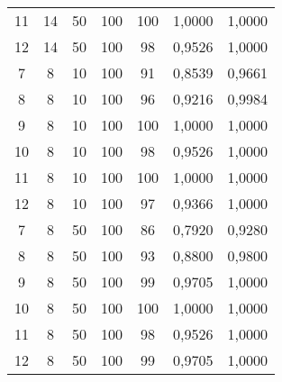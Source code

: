 \begin{table}[H]
\begin{tabular}{@{}ccccccc@{}}
11 & 14                                                    & 50                                                        & 100 & 100 & 1,0000        & 1,0000       \\
12 & 14                                                    & 50                                                        & 100 & 98  & 0,9526        & 1,0000       \\
7  & 8                                                     & 10                                                        & 100 & 91  & 0,8539        & 0,9661       \\
8  & 8                                                     & 10                                                        & 100 & 96  & 0,9216        & 0,9984       \\
9  & 8                                                     & 10                                                        & 100 & 100 & 1,0000        & 1,0000       \\
10 & 8                                                     & 10                                                        & 100 & 98  & 0,9526        & 1,0000       \\
11 & 8                                                     & 10                                                        & 100 & 100 & 1,0000        & 1,0000       \\
12 & 8                                                     & 10                                                        & 100 & 97  & 0,9366        & 1,0000       \\
7  & 8                                                     & 50                                                        & 100 & 86  & 0,7920        & 0,9280       \\
8  & 8                                                     & 50                                                        & 100 & 93  & 0,8800        & 0,9800       \\
9  & 8                                                     & 50                                                        & 100 & 99  & 0,9705        & 1,0000       \\
10 & 8                                                     & 50                                                        & 100 & 100 & 1,0000        & 1,0000       \\
11 & 8                                                     & 50                                                        & 100 & 98  & 0,9526        & 1,0000       \\
12 & 8                                                     & 50                                                        & 100 & 99  & 0,9705        & 1,0000       \\ \bottomrule
\end{tabular}
\end{table}


